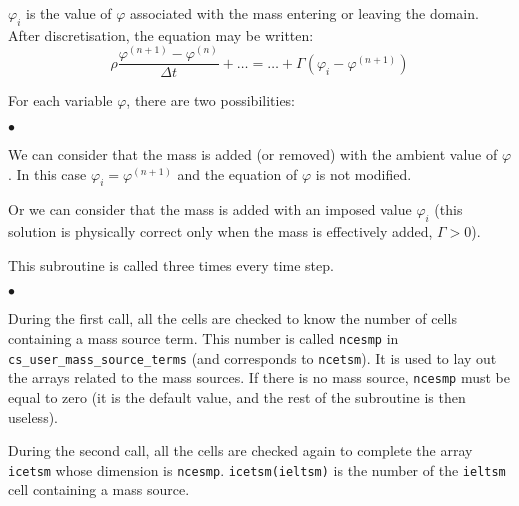 {{{$\varphi_i$ is the value of $\varphi$ associated with the mass entering
or leaving the domain. After discretisation, the equation may be written:
\begin{displaymath}
\rho\frac{\varphi^{(n+1)}-\varphi^{(n)}}{\Delta t} + \ldots
= \ldots + \Gamma(\varphi_i-\varphi^{(n+1)})
\end{displaymath}

For each variable $\varphi$, there are two possibilities:
\begin{list}{$\bullet$}{}
\item We can consider that the mass is added (or removed) with the
      ambient value of $\varphi$. In this case
      $\varphi_i=\varphi^{(n+1)}$ and the equation of $\varphi$ is not
      modified.
\item Or we can consider that the mass is added with an
      imposed value $\varphi_i$ (this solution is physically correct
      only when the mass is effectively added, $\Gamma>0$).
\end{list}

\bigskip

This subroutine is called three times every time step.

\begin{list}{$\bullet$}{}
\item During the first call, all the cells are checked to know the
      number of cells containing a mass source term.
      This number is called \texttt{ncesmp} in
      \texttt{cs\_user\_mass\_source\_terms} (and corresponds to
      \texttt{ncetsm}). It is used to lay out the arrays
      related to the mass sources. If there is no mass source,
      \texttt{ncesmp} must be equal to zero (it is the default value, and the
      rest of the subroutine is then useless).

\item During the second call, all the cells are checked again to
      complete the array \texttt{icetsm} whose dimension is
      \texttt{ncesmp}. \mbox{\texttt{icetsm(ieltsm)}} is the number of the
      \texttt{ieltsm}\raisebox{1ex}{\small th} cell containing a mass source.


\end{list}}}}
